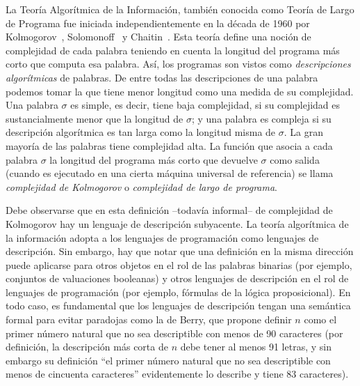 La Teoría Algorítmica de la Información, también
conocida como Teoría de Largo de Programa fue iniciada
independientemente en la década de 1960 por Kolmogorov~\cite{kolmogorov1965three},
Solomonoff~\cite{solomonoff1964formal} y Chaitin~\cite{chaitin1969length}. 
Esta teoría define una
noción de complejidad de cada palabra teniendo en cuenta la longitud
del programa más corto que computa esa palabra. Así, los programas
son vistos como {\em descripciones algorítmicas} de palabras. De
entre todas las descripciones de una palabra podemos tomar la que
tiene menor longitud como una medida de su complejidad. Una palabra
$\sigma$ es simple, es decir, tiene baja complejidad, si su
complejidad es sustancialmente menor que la longitud de $\sigma$; y
una palabra es compleja si su descripción algorítmica es tan larga
como la longitud misma de $\sigma$. La gran mayoría
de las palabras tiene complejidad alta. La función que asocia a cada
palabra $\sigma$ la longitud del programa más corto que devuelve
$\sigma$ como salida (cuando es ejecutado en una cierta máquina
universal de referencia) se llama {\em complejidad de Kolmogorov} o
{\em complejidad de largo de programa}.

Debe
observarse que en esta definición --todavía informal-- 
de complejidad de Kolmogorov hay
un lenguaje de descripción subyacente. La teoría algorítmica de la información
adopta a los lenguajes de programación como lenguajes de descripción. Sin embargo, 
hay que notar que una definición en la misma dirección puede aplicarse para 
otros objetos en el rol de las palabras binarias (por ejemplo, conjuntos de valuaciones 
booleanas) y otros lenguajes de descripción en el rol de lenguajes de programación
(por ejemplo, fórmulas de la lógica proposicional). En todo caso, es fundamental
que los lenguajes de descripción tengan una semántica formal para evitar paradojas
como la de Berry, que propone definir $n$ como el primer número natural que no sea 
descriptible con menos de 90 caracteres (por definición, la descripción más corta de $n$ debe tener al menos 91 letras, y sin embargo su definición ``el primer número natural que no sea descriptible con menos de cincuenta caracteres'' evidentemente lo describe y tiene 83 caracteres).


